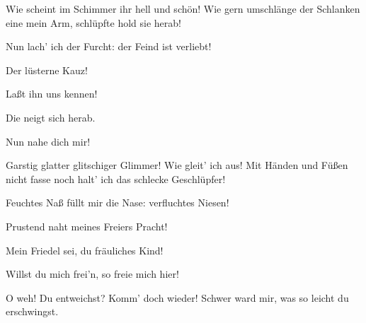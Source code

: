 \begin{drama}
\Alberichspeaks
Wie scheint im Schimmer ihr hell und schön!
Wie gern umschlänge der Schlanken eine mein Arm,
schlüpfte hold sie herab!
 

\Flosshildespeaks
Nun lach' ich der Furcht: der Feind ist verliebt!
 




\Wellgundespeaks
Der lüsterne Kauz!
 

\Woglindespeaks
Laßt ihn uns kennen!
 




\Alberichspeaks
Die neigt sich herab.
 

\Woglindespeaks
Nun nahe dich mir!
 




\Alberichspeaks
Garstig glatter glitschiger Glimmer!
Wie gleit' ich aus! Mit Händen und Füßen
nicht fasse noch halt' ich das schlecke Geschlüpfer!
 



Feuchtes Naß füllt mir die Nase:
verfluchtes Niesen!
 




\Woglindespeaks


Prustend naht meines Freiers Pracht!
 

\Alberichspeaks
Mein Friedel sei, du fräuliches Kind!
 




\Woglindespeaks


Willst du mich frei'n, so freie mich hier!
 




\Alberichspeaks


O weh! Du entweichst? Komm' doch wieder!
Schwer ward mir, was so leicht du erschwingst.
 


\end{drama}
